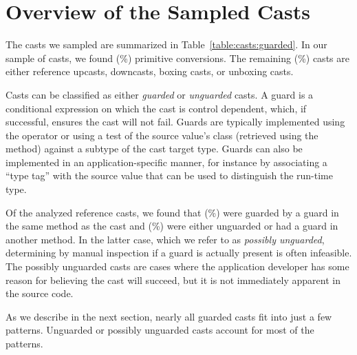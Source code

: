 \section{Overview of the Sampled Casts}\label{sec:casts:overview}

The casts we sampled are summarized in Table~\ref{table:casts:guarded}.
In our sample of \nSize{} casts,
we found \nPrimitivePattern{} (\pPrimitivePattern\%) primitive conversions.
The remaining \nReference{} (\pReference\%) casts are either reference upcasts,
downcasts, boxing casts, or unboxing casts.



Casts can be classified as either \emph{guarded} or \emph{unguarded} casts.
A guard is a conditional expression on which the cast is control dependent,
which, if successful, ensures the cast will not fail.
Guards are typically implemented using the  operator or using
a test of the source value's class (retrieved using the
 method) against a subtype of the cast target type.
Guards can also be implemented in an application-specific manner, for instance
by associating a ``type tag'' with the source value that can be used to
distinguish the run-time type.

Of the \nReference{} analyzed reference casts,
we found that \nGuarded{} (\pGuarded\%) were guarded by a
guard in the same method as the cast and \nUnguarded{} (\pUnguarded\%)
were either unguarded or had a guard in another method.
In the latter case, which we refer to as \emph{possibly unguarded},
determining by manual inspection if a guard is actually
present is often infeasible. The possibly unguarded casts are cases where the application developer
has some reason for believing the cast will succeed, but it is not immediately
apparent in the source code.

As we describe in the next section, nearly all guarded casts fit into just a
few patterns. Unguarded or possibly unguarded casts account for most of the
patterns.